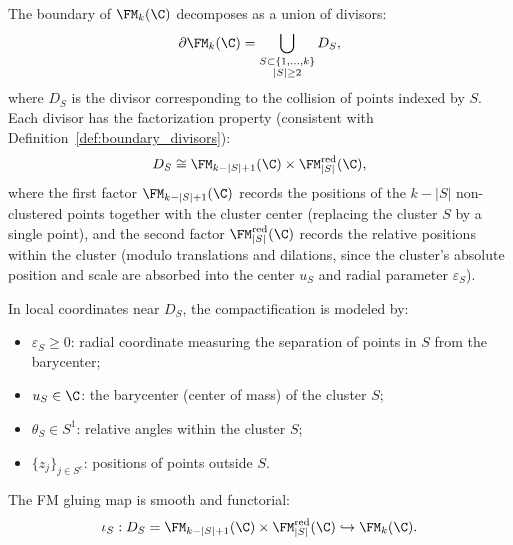 \begin{proposition}
\label{prop:FM_boundary}
The boundary of $\FM_k(\C)$ decomposes as a union of divisors:
\[
\partial \FM_k(\C) = \bigcup_{\substack{S \subset \{1, \ldots, k\} \\ |S| \geq 2}} D_S,
\]
where $D_S$ is the divisor corresponding to the collision of points indexed by $S$. Each divisor has the factorization property (consistent with Definition~\ref{def:boundary_divisors}):
\[
D_S \cong \FM_{k - |S| + 1}(\C) \times \FM_{|S|}^{\mathrm{red}}(\C),
\]
where the first factor $\FM_{k-|S|+1}(\C)$ records the positions of the $k - |S|$ non-clustered points together with the cluster center (replacing the cluster $S$ by a single point), and the second factor $\FM_{|S|}^{\mathrm{red}}(\C)$ records the relative positions within the cluster (modulo translations and dilations, since the cluster's absolute position and scale are absorbed into the center $u_S$ and radial parameter $\varepsilon_S$).

In local coordinates near $D_S$, the compactification is modeled by:
\begin{itemize}
\item $\varepsilon_S \geq 0$: radial coordinate measuring the separation of points in $S$ from the barycenter;
\item $u_S \in \C$: the barycenter (center of mass) of the cluster $S$;
\item $\theta_S \in S^1$: relative angles within the cluster $S$;
\item $\{z_j\}_{j \in S^c}$: positions of points outside $S$.
\end{itemize}

The FM gluing map is smooth and functorial:
\[
\iota_S : D_S = \FM_{k-|S|+1}(\C) \times \FM_{|S|}^{\mathrm{red}}(\C) \hookrightarrow \FM_k(\C).
\]
\end{proposition}

